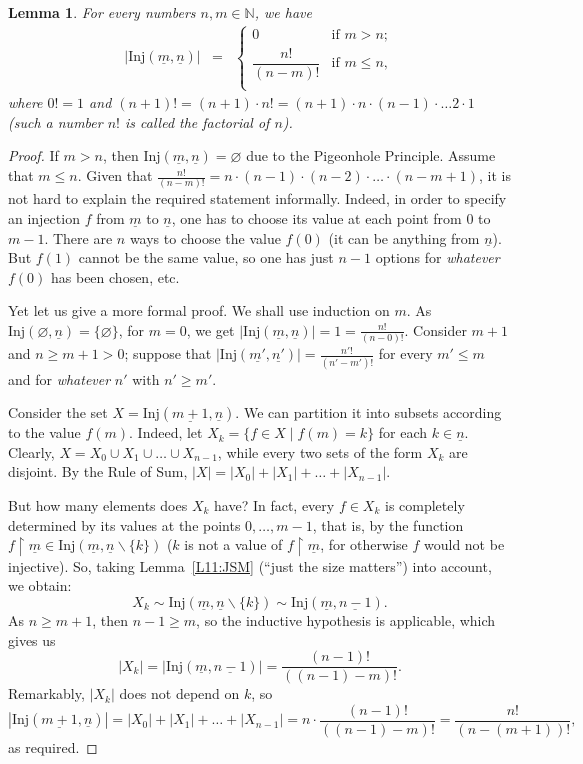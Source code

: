 \documentclass[12pt,notitlepage]{article}
\theoremstyle{plain}
\newtheorem{lemma}[thm]{Lemma}
\theoremstyle{definition}
\theoremstyle{plain}
\newcommand{\N}{\mathbb{N}}
\renewcommand{\setminus}{\smallsetminus}
\newcommand{\void}{\varnothing}
\newcommand{\rst}{\mathop{\upharpoonright}}
\newcommand{\ul}[1]{\underline{#1}}
\newcommand{\1}{\mathbf{1}}
\newcommand{\0}{\mathbf{0}}
\begin{document}
\begin{lemma}\label{L11:num_inj}
For every numbers $n, m \in \N$, we have
$$
\begin{array}{rcll}
|\mathrm{Inj}(\ul{m},\ul{n})| &=& \begin{cases}
			0&\mbox{if } m > n;\\
			\dfrac{n!}{(n-m)!}&\mbox{if } m \leq n,\\
		\end{cases}
\end{array}
$$
where $0! = 1$ and $(n + 1)! = (n + 1)\cdot n! = (n+1)\cdot n \cdot (n - 1) \cdot \ldots 2 \cdot 1$ (such a number $n!$ is called the \emph{factorial} of $n$).
\end{lemma}
\begin{proof}
If $m > n$, then $\mathrm{Inj}(\ul{m},\ul{n}) = \void$ due to the Pigeonhole Principle. Assume that $m \leq n$. Given that $\frac{n!}{(n-m)!} = n\cdot (n - 1) \cdot (n - 2) \cdot \ldots \cdot (n - m + 1)$, it is not hard to explain the required statement informally. Indeed, in order to specify an injection $f$ from $\ul{m}$ to $\ul{n}$, one has to choose its value at each point from $0$ to $m - 1$. There are $n$ ways to choose the value $f(0)$ (it can be anything from $\ul{n}$). But $f(1)$ cannot be the same value, so one has just $n - 1$ options for \emph{whatever} $f(0)$ has been chosen, etc.

Yet let us give a more formal proof. We shall use induction on $m$. As $\mathrm{Inj}(\void,\ul{n}) = \{ \void \}$, for $m = 0$, we get $|\mathrm{Inj}(\ul{m},\ul{n})| = 1 = \frac{n!}{(n - 0)!}$. Consider $m + 1$ and $n \geq m + 1 > 0$; suppose that $|\mathrm{Inj}(\ul{m'},\ul{n'})| = \frac{n'!}{(n'-m')!}$ for every $m' \leq m$ and for \emph{whatever} $n'$ with $n' \geq m'$.

Consider the set $X = \mathrm{Inj}(\ul{m+1},\ul{n})$. We can partition it into subsets according to the value $f(m)$. Indeed, let $X_k = \{ f\in X \mid f(m) = k \}$ for each $k \in \ul{n}$. Clearly, $X = X_0 \cup X_1 \cup \ldots \cup X_{n-1}$, while every two sets of the form $X_k$ are disjoint. By the Rule of Sum, $|X| = |X_0| + |X_1| + \ldots + |X_{n-1}|$.

But how many elements does $X_k$ have? In fact, every $f \in X_k$ is completely determined by its values at the points $0,\ldots,m-1$, that is, by the function $f \rst \ul{m} \in \mathrm{Inj}(\ul{m}, \ul{n} \setminus \{k\})$ ($k$ is not a value of $f\rst \ul{m}$, for otherwise $f$ would not be injective). So, taking Lemma~\ref{L11:JSM} (``just the size matters'') into account, we obtain:
$$X_k \sim \mathrm{Inj}(\ul{m}, \ul{n} \setminus \{k\}) \sim \mathrm{Inj}(\ul{m}, \ul{n - 1}).$$
As $n \geq m + 1$, then $n - 1 \geq m$, so the inductive hypothesis is applicable, which gives us
$$|X_k| = |\mathrm{Inj}(\ul{m}, \ul{n - 1})| = \dfrac{(n-1)!}{((n-1) - m)!}.$$
Remarkably, $|X_k|$ does not depend on $k$, so
$$|\mathrm{Inj}(\ul{m+1},\ul{n})| = |X_0| + |X_1| + \ldots + |X_{n-1}| = n \cdot \dfrac{(n-1)!}{((n-1) - m)!} = \dfrac{n!}{(n- (m + 1))!},$$
as required.
\end{proof}
\end{document}
